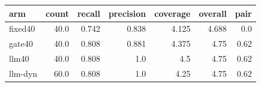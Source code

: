 \begin{tabular}{lrrrrrr}
\toprule
arm & count & recall & precision & coverage & overall & pair \\
\midrule
fixed40 & 40.0 & 0.742 & 0.838 & 4.125 & 4.688 & 0.0 \\
gate40 & 40.0 & 0.808 & 0.881 & 4.375 & 4.75 & 0.62 \\
llm40 & 40.0 & 0.808 & 1.0 & 4.5 & 4.75 & 0.62 \\
llm-dyn & 60.0 & 0.808 & 1.0 & 4.25 & 4.75 & 0.62 \\
\bottomrule
\end{tabular}
